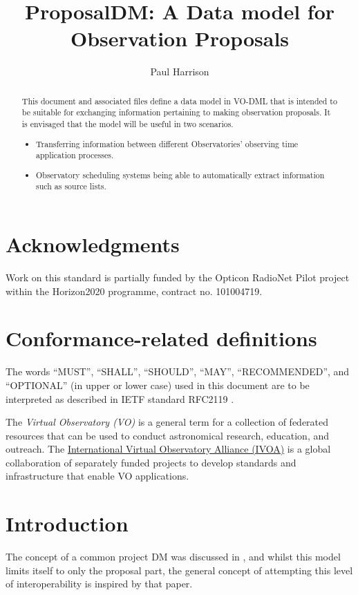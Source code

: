 \documentclass[10pt,a4paper]{ivoa}
\title{ProposalDM: A Data model for Observation Proposals}
\author[????URL????]{Paul Harrison}
\begin{document}
\begin{abstract}
This document and associated files define a data model in VO-DML that is intended to be suitable for exchanging
    information pertaining to making observation proposals. It is envisaged that the model will be useful in two scenarios.
\begin{itemize}
    \item Transferring information between different Observatories' observing time application processes.
    \item Observatory scheduling systems being able to automatically extract information such as source lists.
\end{itemize}
\end{abstract}


\section*{Acknowledgments}

Work on this standard is partially funded by the Opticon RadioNet Pilot project within the Horizon2020 programme, contract no. 101004719.

\section*{Conformance-related definitions}

The words ``MUST'', ``SHALL'', ``SHOULD'', ``MAY'', ``RECOMMENDED'', and
``OPTIONAL'' (in upper or lower case) used in this document are to be
interpreted as described in IETF standard RFC2119 \citep{std:RFC2119}.

The \emph{Virtual Observatory (VO)} is a
general term for a collection of federated resources that can be used
to conduct astronomical research, education, and outreach.
The \href{https://www.ivoa.net}{International
Virtual Observatory Alliance (IVOA)} is a global
collaboration of separately funded projects to develop standards and
infrastructure that enable VO applications.


\section{Introduction}


The concept of a common project DM was discussed in \cite{2008SPIE.7019E..0PB}, and whilst this model limits itself to
only the proposal part, the general concept of attempting this level of interoperability is inspired by that paper.
\end{document}

